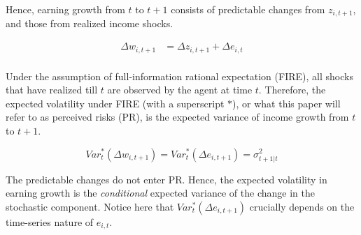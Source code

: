 Hence, earning growth from \(t\) to \(t+1\) consists of predictable changes from
$z_{i,t+1}$, and those from realized income shocks.

\begin{equation}
\begin{split}
\label{Eq:IncProcess1}
\Delta w_{i,t+1} & =  \Delta z_{i,t+1} + \Delta e_{i,t} \\
\end{split}
\end{equation}

Under the assumption of full-information rational expectation (FIRE), all shocks that have realized till \(t\) are observed by the agent at
time \(t\). Therefore, the expected volatility under FIRE (with a superscript $*$), or what this paper will refer to as perceived risks (PR), is the expected
variance of income growth from \(t\) to \(t+1\).

\begin{equation}
Var_{t}^*(\Delta w_{i,t+1}) =Var_{t}^*(\Delta e_{i,t+1}) =\sigma^2_{t+1|t}
\end{equation}

The predictable changes do not enter PR. Hence, the expected volatility in earning growth is the \emph{conditional} expected variance of the change in the stochastic component. Notice here that $Var_{t}^*(\Delta e_{i,t+1})$ crucially depends on the time-series nature of $e_{i,t}$.



\begin{comment}
Under FIRE, there are a number of testable predictions about the patterns of
perceived risks.

\begin{itemize}
\item
  \textbf{No within-group disagreement}. First, agents who share the same income process have no disagreements
  on perceived risks. This can be checked by comparing
  within-cohort/group dispersion in perceived risks.
\item
  \textbf{State-independence}. Second, the perceived risks under such the assumed process above are
  not dependent on past/recent income realizations. To put it differently, there is no correlation between realized shocks and the perceived risks. This can be tested
  by estimating the correlation between perceived risks and past income
  realizations or their proxies if the latter is not directly observed. 
\item
  \textbf{Correct decomposition}. Third, under the assumed progress, the variances of permanent and transitory
  shocks enter perceived risks with loading of 1.
\end{itemize}

\end{comment}

